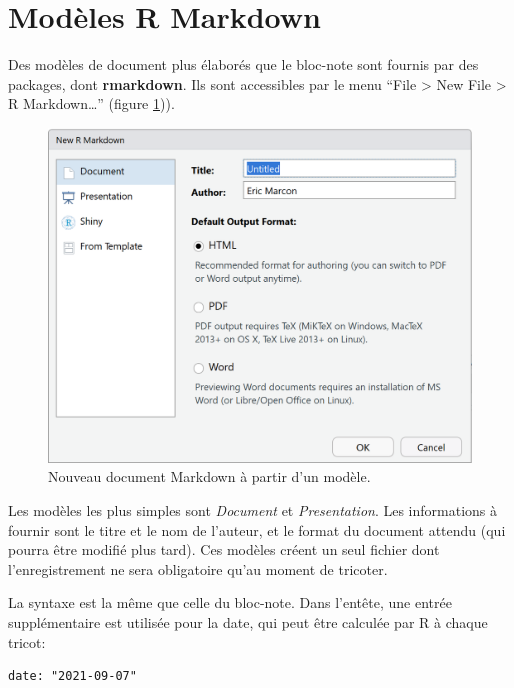 \documentclass[
  12pt,
  french,
  a4paper,
  extrafontsizes,onecolumn,openright
  ]{memoir}
\begin{document}
\hypertarget{moduxe8les-r-markdown}{%
\section{Modèles R Markdown}\label{moduxe8les-r-markdown}}

Des modèles de document plus élaborés que le bloc-note sont fournis par des packages, dont \textbf{rmarkdown}.
Ils sont accessibles par le menu \enquote{File \textgreater{} New File \textgreater{} R Markdown\ldots{}} (figure \ref{fig:e-rmd1})).



\scriptsize

\begin{figure}

{\centering \includegraphics[width=0.8\linewidth]{images/e-rmd1} 

}

\caption{Nouveau document Markdown à partir d'un modèle.}\label{fig:e-rmd1}
\end{figure}

\normalsize

Les modèles les plus simples sont \emph{Document} et \emph{Presentation}.
Les informations à fournir sont le titre et le nom de l'auteur, et le format du document attendu (qui pourra être modifié plus tard).
Ces modèles créent un seul fichier dont l'enregistrement ne sera obligatoire qu'au moment de tricoter.

La syntaxe est la même que celle du bloc-note.
Dans l'entête, une entrée supplémentaire est utilisée pour la date, qui peut être calculée par R à chaque tricot:

\begin{verbatim}
date: "2021-09-07"
\end{verbatim}
\end{document}
